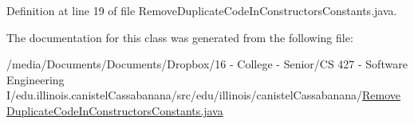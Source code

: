 Definition at line 19 of file RemoveDuplicateCodeInConstructorsConstants.java.



The documentation for this class was generated from the following file:\begin{DoxyCompactItemize}
\item 
/media/Documents/Documents/Dropbox/16 -\/ College -\/ Senior/CS 427 -\/ Software Engineering I/edu.illinois.canistelCassabanana/src/edu/illinois/canistelCassabanana/\hyperlink{RemoveDuplicateCodeInConstructorsConstants_8java}{RemoveDuplicateCodeInConstructorsConstants.java}\end{DoxyCompactItemize}
